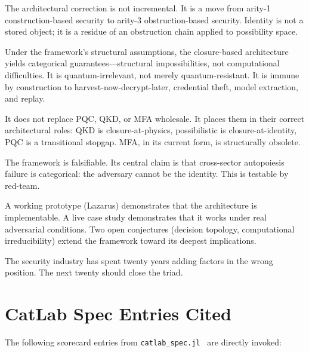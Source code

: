 \documentclass[11pt,a4paper]{article}
\theoremstyle{definition}
\theoremstyle{remark}
\begin{document}
The architectural correction is not incremental. It is a move from arity-1 construction-based security to arity-3 obstruction-based security. Identity is not a stored object; it is a residue of an obstruction chain applied to possibility space.

Under the framework's structural assumptions, the closure-based architecture yields categorical guarantees---structural impossibilities, not computational difficulties. It is quantum-irrelevant, not merely quantum-resistant. It is immune by construction to harvest-now-decrypt-later, credential theft, model extraction, and replay.

It does not replace PQC, QKD, or MFA wholesale. It places them in their correct architectural roles: QKD is closure-at-physics, possibilistic is closure-at-identity, PQC is a transitional stopgap. MFA, in its current form, is structurally obsolete.

The framework is falsifiable. Its central claim is that cross-sector autopoiesis failure is categorical: the adversary cannot be the identity. This is testable by red-team.

A working prototype (Lazarus) demonstrates that the architecture is implementable. A live case study demonstrates that it works under real adversarial conditions. Two open conjectures (decision topology, computational irreducibility) extend the framework toward its deepest implications.

The security industry has spent twenty years adding factors in the wrong position. The next twenty should close the triad.

\appendix

\section{CatLab Spec Entries Cited}

The following scorecard entries from \texttt{catlab\_spec.jl}~\cite{green2026} are directly invoked:
\end{document}
